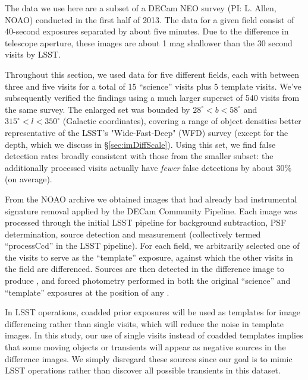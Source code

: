 The data we use here are a subset of a DECam NEO survey (PI: L. Allen, NOAO) conducted
in the first half of 2013. The data for a given field consist of 40-second exposures separated
by about five minutes. Due to the difference in telescope aperture, these images
are about 1 mag shallower than the 30 second visits by LSST.

Throughout this section, we used data for
five different fields, each with between three and five visits for a total of 15
``science'' visits plus 5 template visits. We've subsequently verified the findings using a much larger superset of 540 visits from the same survey. The enlarged set was bounded by $28^\circ < b < 58^\circ$ and $315^\circ < l < 350^\circ$ (Galactic coordinates), covering a range of object densities better representative of the LSST's "Wide-Fast-Deep" (WFD) survey (except for the depth, which we discuss in \S\ref{sec:imDiffScale}). Using this set, we find false detection rates broadly consistent with those from the smaller subset: the additionally processed visits actually have {\em fewer} false detections by about 30\% (on average).

From the NOAO archive we obtained images that had already had instrumental
signature removal applied by the DECam Community Pipeline. Each image was
processed through the initial LSST pipeline for background subtraction, PSF
determination, source detection and measurement (collectively
termed ``processCcd'' in the LSST pipeline). For each field, we arbitrarily
selected one of the visits to serve as the ``template'' exposure, against which
the other visits in the field are differenced. Sources are then detected in the
difference image to produce \DIASources, and forced photometry performed in both
the original ``science'' and ``template'' exposures at the position of any
\DIASource.

In LSST operations, coadded prior exposures will be used
as templates for image differencing rather than single visits, which will reduce
the noise in template images. In this study, our use of single visits instead of
coadded templates implies that some moving objects or transients will appear as
negative sources in the difference images. We simply disregard these sources
since our goal is to mimic LSST operations rather than discover all possible
transients in this dataset.


